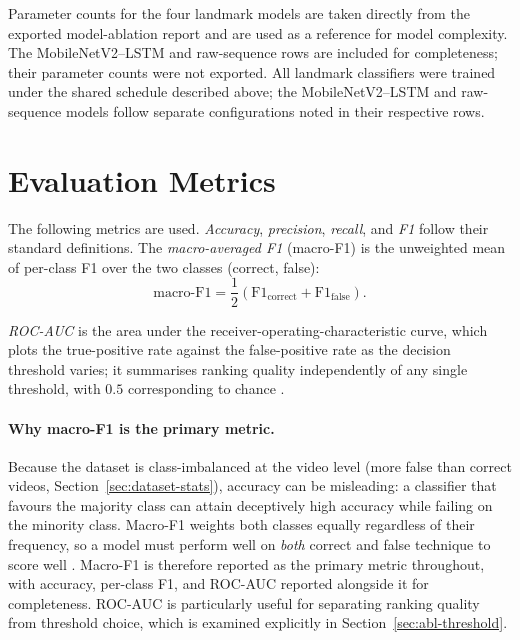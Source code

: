 Parameter counts for the four landmark models are taken directly from the
exported model-ablation report and are used as a reference for model complexity.
The MobileNetV2--LSTM and raw-sequence rows are included for completeness;
their parameter counts were not exported. All landmark classifiers were trained
under the shared schedule described above; the MobileNetV2--LSTM and
raw-sequence models follow separate configurations noted in their respective
rows.

\section{Evaluation Metrics}
\label{sec:setup-metrics}

The following metrics are used.
\emph{Accuracy}, \emph{precision}, \emph{recall}, and \emph{F1} follow their standard definitions.
The \emph{macro-averaged F1} (macro-F1) is the unweighted mean of per-class F1 over the two classes (correct, false):
\begin{equation}
\mathrm{macro\text{-}F1} =
\frac{1}{2}\left(\mathrm{F1}_{\text{correct}} + \mathrm{F1}_{\text{false}}\right).
\end{equation}

\emph{ROC-AUC} is the area under the receiver-operating-characteristic curve,
which plots the true-positive rate against the false-positive rate as the
decision threshold varies; it summarises ranking quality independently of any
single threshold, with $0.5$ corresponding to chance \cite{fawcett2006roc}.

\paragraph{Why macro-F1 is the primary metric.}
Because the dataset is class-imbalanced at the video level (more false than
correct videos, Section~\ref{sec:dataset-stats}), accuracy can be misleading: a
classifier that favours the majority class can attain deceptively high accuracy
while failing on the minority class. Macro-F1 weights both classes equally
regardless of their frequency, so a model must perform well on \emph{both}
correct and false technique to score well \cite{sokolova2009metrics}. Macro-F1 is
therefore reported as the primary metric throughout, with accuracy, per-class
F1, and ROC-AUC reported alongside it for completeness. ROC-AUC is particularly
useful for separating ranking quality from threshold choice, which is examined
explicitly in Section~\ref{sec:abl-threshold}.

